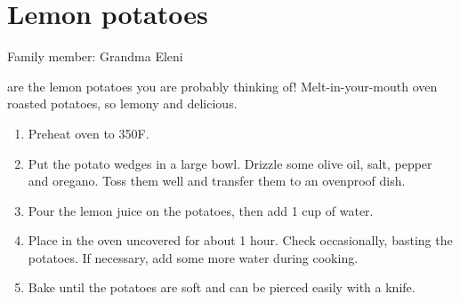 \chapter{Lemon potatoes}
\label{ch:lemonpotatoes}


Family member: Grandma Eleni

 are the lemon potatoes you are probably thinking of! Melt-in-your-mouth oven roasted potatoes, so lemony and delicious.

\begin{enumerate}
    \item Preheat oven to 350\degree F.
    \item Put the potato wedges in a large bowl. Drizzle some olive oil, salt, pepper and oregano. Toss them well and transfer them to an ovenproof dish.
    \item Pour the lemon juice on the potatoes, then add 1 cup of water.
    \item Place in the oven uncovered for about 1 hour. Check occasionally, basting the potatoes. If necessary, add some more water during cooking.
    \item Bake until the potatoes are soft and can be pierced easily with a knife.
\end{enumerate}
